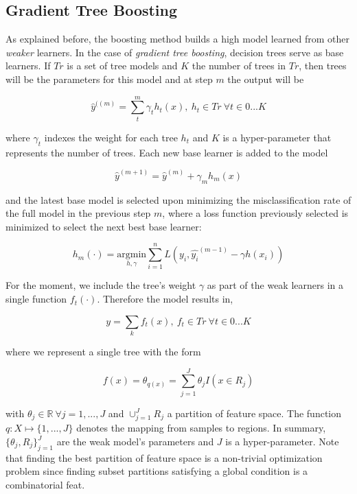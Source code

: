 \subsection{Gradient Tree Boosting}

As explained before, the boosting method builds a high model learned from other \textit{weaker} learners. In the case of \textit{gradient tree boosting}, decision trees serve as base learners. If $Tr$ is a set of tree models and $K$ the number of trees in $Tr$, then trees will be the parameters for this model and at step $m$ the output will be

\begin{equation}
\hat{y}^{((m)}=  \sum_t^m \gamma_t h_t(x) , \  h_t \in Tr \ \forall t \in {0...K}
\end{equation}

where $\gamma_t$ indexes the weight for each tree $h_t$ and $K$ is a hyper-parameter that represents the number of trees. Each new base learner is added to the model

\begin{equation}
\hat{y}^{(m+1)} =   \hat{y}^{(m)}  + \gamma_m h_m(x)
\end{equation}

and the latest base model is selected upon minimizing the misclassification rate of the full model in the previous step $m$, where a loss function previously selected is minimized to select the next best base learner:

\begin{equation}
h_m(\cdot) = \underset{h,\gamma}{\mathrm{argmin}}   \sum_{i=1}^{n} L ( y_i,  \hat{y_i}^{(m-1)} -  \gamma h(x_i)  )
\end{equation}


For the moment, we include the tree's weight $\gamma$ as part of the weak learners in a single function $f_t(\cdot)$. Therefore the model results in,

\begin{equation}
y =  \sum_k f_t(x) ,  \ f_t \in Tr  \ \forall t \in {0...K}
\end{equation}

where we represent a single tree with the form

\begin{equation}
f(x) = \theta_{q(x)} = \sum_{j=1}^J \theta_j I(x \in  R_j)
\end{equation}

with $\theta_j \in \mathbb{R} \ \forall j = 1,...,J$ and $ \cup_{j=1}^J R_j$ a partition of feature space. The function $q : X \mapsto \{1,...,J\}$ denotes the mapping from samples to regions. In summary, $\{\theta_j, R_j\}_{j=1}^J$ are the weak model's parameters and $J$ is a hyper-parameter. Note that finding the best partition of feature space is a non-trivial optimization problem since finding subset partitions satisfying a global condition is a combinatorial feat.

